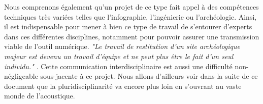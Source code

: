 Nous comprenons également qu'un projet de ce type fait appel à des compétences techniques très variées telles que l'infographie, l'ingénierie ou l'archéologie. Ainsi, il est indispensable pour mener à bien ce type de travail de s'entourer d'experts dans ces différentes disciplines, notamment pour pouvoir assurer une transmission viable de l'outil numérique. \textit{"Le travail de restitution d’un site archéologique majeur est devenu un travail d’équipe et ne peut plus être le fait d’un seul individu."} \cite[p. 158]{archeogrid}. Cette communication interdisciplinaire est aussi une difficulté non-négligeable sous-jacente à ce projet. Nous allons d'ailleurs voir dans la suite de ce document que la pluridisciplinarité va encore plus loin en s'ouvrant au vaste monde de l'acoustique. 
	
	
			
 
 



